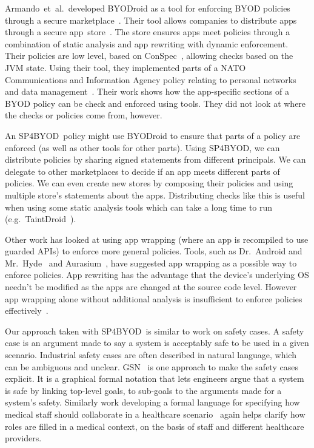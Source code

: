 \documentclass{llncs}
\makeatletter
\newcommand{\etal}{et~al.\@}
\newcommand{\AppPAL}[0]{SP4BYOD}
\makeatother
\begin{document}
Armando~\etal~developed BYODroid as a tool for enforcing BYOD policies through a secure marketplace~\cite{armando_bring_2013}.
Their tool allows companies to distribute apps through a secure app~store~\cite{armando_enabling_2014}.
The store ensures apps meet policies through a combination of static analysis and app rewriting with dynamic enforcement.
Their policies are low level, based on ConSpec~\cite{aktug_conspec_2008}, allowing checks based on the JVM state.
Using their tool, they implemented parts of a NATO Communications and Information Agency policy relating to personal networks and data management~\cite{armando_developing_2016}.
Their work shows how the app-specific sections of a BYOD policy can be check and enforced using tools.
They did not look at where the checks or policies come from, however.

An \AppPAL~policy might use BYODroid to ensure that parts of a policy are enforced (as well as other tools for other parts).
Using \AppPAL, we can distribute policies by sharing signed statements from different principals.
We can delegate to other marketplaces to decide if an app meets different parts of policies.
We can even create new stores by composing their policies and using multiple store's statements about the apps.
Distributing checks like this is useful when using some static analysis tools which can take a long time to run (e.g.~TaintDroid~\cite{enck_taintdroid:_2014}).

Other work has looked at using app wrapping (where an app is recompiled to use guarded APIs) to enforce more general policies.
Tools, such as Dr.~Android and Mr.~Hyde~\cite{jeon_dr._2012} and Aurasium~\cite{xu_aurasium:_2012}, have suggested app wrapping as a possible way to enforce policies.
App rewriting has the advantage that the device's underlying OS needn't be modified as the apps are changed at the source code level.
However app wrapping alone without additional analysis is insufficient to enforce policies effectively~\cite{hao_effectiveness_2013}.

Our approach taken with \AppPAL~is similar to work on safety cases.
A safety case is an argument made to say a system is acceptably safe to be used in a given scenario.
Industrial safety cases are often described in natural language, which can be ambiguous and unclear.
\ac{GSN}~\cite{tim_kelly_goal_2004} is one approach to make the safety cases explicit.
It is a graphical formal notation that lets engineers argue that a system is safe by linking top-level goals, to sub-goals to the arguments made for a system's safety.
Similarly work developing a formal language for specifying how medical staff should collaborate in a healthcare scenario~\cite{papapanagiotou_formal_2014} again helps clarify how roles are filled in a medical context, on the basis of staff and different healthcare providers.
\end{document}
